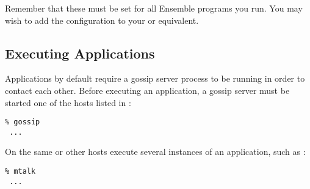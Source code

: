 Remember that these must be set for all Ensemble programs you run.
You may wish to add the configuration to your  or
equivalent.

\subsection{Executing Applications}
Applications by default require a gossip server process to be running
in order to contact each other.  Before executing an application, a
gossip server must be started one of the hosts listed in
:
\begin{verbatim}
% gossip
 ...
\end{verbatim}
On the same or other hosts execute several instances of an
application, such as :
\begin{verbatim}
% mtalk
 ...
\end{verbatim}
